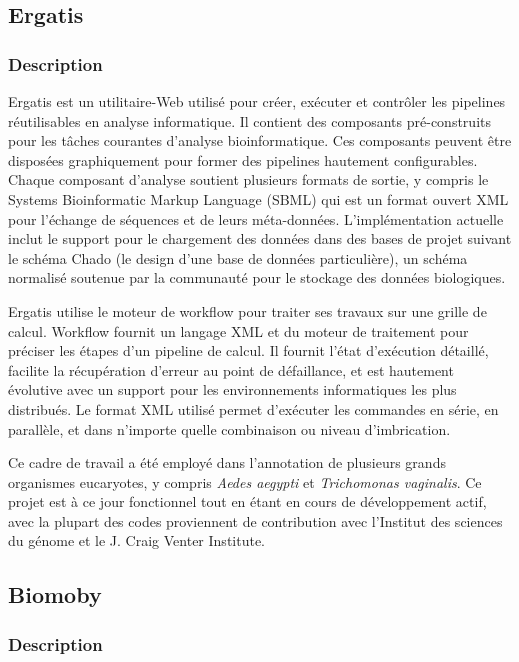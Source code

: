 \subsection{Ergatis}
\subsubsection{Description}

Ergatis est un utilitaire-Web  utilisé pour créer, exécuter et contrôler les pipelines réutilisables en analyse informatique. Il contient des composants pré-construits pour les tâches courantes d'analyse bioinformatique. Ces composants peuvent être disposées graphiquement pour former des pipelines hautement configurables. Chaque composant d'analyse soutient plusieurs formats de sortie, y compris le Systems Bioinformatic Markup Language (SBML) qui est un format ouvert XML pour l'échange de séquences et de leurs méta-données. L'implémentation actuelle inclut le support pour le chargement des données dans des bases de projet suivant le schéma Chado (le design d'une base de données particulière), un schéma normalisé soutenue par la communauté  pour le stockage des données biologiques.

Ergatis utilise le moteur de workflow pour traiter ses travaux sur une grille de calcul. Workflow fournit un langage XML et du moteur de traitement pour préciser les étapes d'un pipeline de calcul. Il fournit l'état d'exécution détaillé, facilite la récupération d'erreur au point de défaillance, et est hautement évolutive avec un support pour les environnements informatiques les plus distribués. Le format XML utilisé permet d'exécuter les commandes  en série, en parallèle, et dans n'importe quelle combinaison ou niveau d'imbrication.

Ce cadre de travail a été employé dans l'annotation de plusieurs grands organismes eucaryotes, y compris \textit{Aedes aegypti} et \textit{Trichomonas vaginalis}.
Ce projet est à ce jour fonctionnel tout en étant en cours de développement actif, avec la plupart des codes proviennent de contribution avec l'Institut des sciences du génome et le J. Craig Venter Institute.

\subsection{Biomoby}
\subsubsection{Description}

